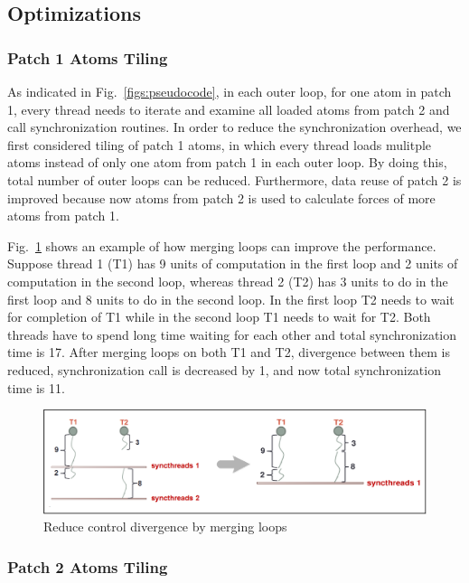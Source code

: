 \subsection{Optimizations}
\subsubsection{Patch 1 Atoms Tiling}

As indicated in Fig.~\ref{figs:pseudocode}, in each outer loop, for one atom in patch 1, every thread needs to iterate and examine all loaded atoms from patch 2
and call synchronization routines. In order to reduce the synchronization overhead, we first considered tiling of patch 1 atoms,
in which every thread loads mulitple atoms instead of only one atom from patch 1 in each outer loop.
By doing this, total number of outer loops can be reduced. Furthermore, data reuse of patch 2 is improved because now atoms from patch 2 is used to calculate
forces of more atoms from patch 1.

Fig.~\ref{figs:divergence} shows an example of how merging loops can improve the performance. Suppose thread 1 (T1) has 9 units of computation in the first loop and 2 units
of computation in the second loop, whereas thread 2 (T2) has 3 units to do in the first loop and 8 units to do in the second loop. In the first loop T2 needs to wait for
completion of T1 while in the second loop T1 needs to wait for T2. Both threads have to spend long time waiting for each other and total synchronization time is 17.
After merging loops on both T1 and T2, divergence between them is reduced, synchronization call is decreased by 1, and now total synchronization time is 11.

\begin{figure}[h]
\centering
\setlength{\abovecaptionskip}{-1pt}
\setlength{\belowcaptionskip}{-5pt}
\includegraphics[width=6.0in]{figs/divergence-eps-converted-to}
\caption{Reduce control divergence by merging loops}
\label{figs:divergence}
\vspace{-0.5cm}
\end{figure}

\subsubsection{Patch 2 Atoms Tiling}

